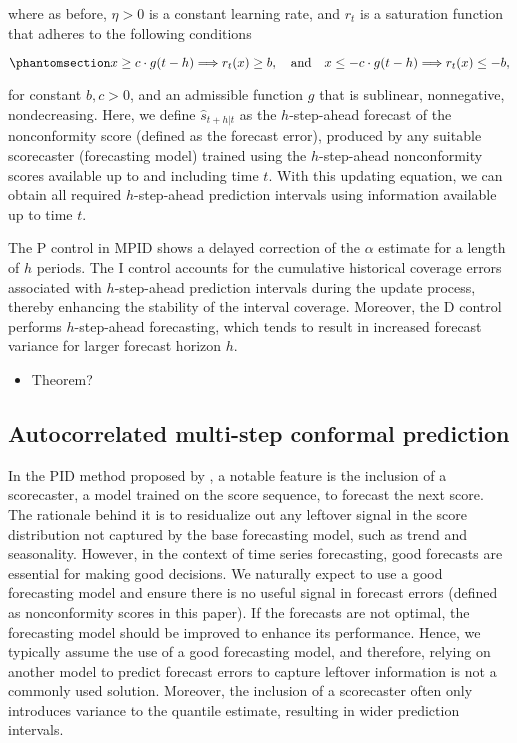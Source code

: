 \documentclass[
  11pt,
  a4paper,
]{article}
\providecommand{\tightlist}{%
  \setlength{\itemsep}{0pt}\setlength{\parskip}{0pt}}\usepackage{longtable,booktabs,array}
\theoremstyle{plain}
\theoremstyle{plain}
\theoremstyle{remark}
\begin{document}
where as before, \(\eta > 0\) is a constant learning rate, and \(r_t\)
is a saturation function that adheres to the following conditions

\begin{equation}\phantomsection\label{eq-saturation_h}{
x \geq c \cdot g(t-h) \Longrightarrow r_t(x) \geq b, \quad \text {and} \quad x \leq-c \cdot g(t-h) \Longrightarrow r_t(x) \leq -b,
}\end{equation}

for constant \(b, c > 0\), and an admissible function \(g\) that is
sublinear, nonnegative, nondecreasing. Here, we define
\(\hat{s}_{t+h|t}\) as the \(h\)-step-ahead forecast of the
nonconformity score (defined as the forecast error), produced by any
suitable scorecaster (forecasting model) trained using the
\(h\)-step-ahead nonconformity scores available up to and including time
\(t\). With this updating equation, we can obtain all required
\(h\)-step-ahead prediction intervals using information available up to
time \(t\).

The P control in MPID shows a delayed correction of the \(\alpha\)
estimate for a length of \(h\) periods. The I control accounts for the
cumulative historical coverage errors associated with \(h\)-step-ahead
prediction intervals during the update process, thereby enhancing the
stability of the interval coverage. Moreover, the D control performs
\(h\)-step-ahead forecasting, which tends to result in increased
forecast variance for larger forecast horizon \(h\).

\begin{itemize}
\tightlist
\item
  Theorem?
\end{itemize}

\subsection{Autocorrelated multi-step conformal
prediction}\label{sec-acmcp}

In the PID method proposed by \textcite{angelopoulos2024}, a notable
feature is the inclusion of a scorecaster, a model trained on the score
sequence, to forecast the next score. The rationale behind it is to
residualize out any leftover signal in the score distribution not
captured by the base forecasting model, such as trend and seasonality.
However, in the context of time series forecasting, good forecasts are
essential for making good decisions. We naturally expect to use a good
forecasting model and ensure there is no useful signal in forecast
errors (defined as nonconformity scores in this paper). If the forecasts
are not optimal, the forecasting model should be improved to enhance its
performance. Hence, we typically assume the use of a good forecasting
model, and therefore, relying on another model to predict forecast
errors to capture leftover information is not a commonly used solution.
Moreover, the inclusion of a scorecaster often only introduces variance
to the quantile estimate, resulting in wider prediction intervals.
\end{document}
